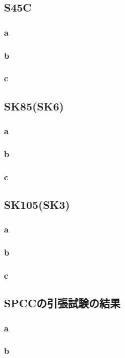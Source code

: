 \documentclass[10pt,a4j]{jsarticle}
\begin{document}
  \subsection{S45C}
      \subsubsection{a}
    \subsubsection{b}
    \subsubsection{c}
  \subsection{SK85(SK6)}
      \subsubsection{a}
    \subsubsection{b}
    \subsubsection{c}
  \subsection{SK105(SK3)}
    \subsubsection{a}
    \subsubsection{b}
    \subsubsection{c}
  \subsection{SPCCの引張試験の結果}
    \subsubsection{a}
    \subsubsection{b}
\end{document}
